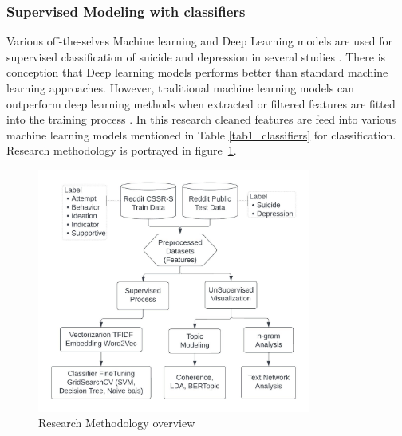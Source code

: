\documentclass[sn-mathphys,Numbered]{sn-jnl}%
\theoremstyle{thmstyleone}%
\theoremstyle{thmstyletwo}%
\theoremstyle{thmstylethree}%
\begin{document}
\subsubsection{Supervised Modeling with classifiers}
Various off-the-selves Machine learning and Deep Learning models are used for supervised classification of suicide and depression in several studies \cite{castillo2020suicide, zhang2022natural}. There is conception that Deep learning models performs better than standard machine learning approaches. However, traditional machine learning models can outperform deep learning methods when extracted or filtered features are fitted into the training process \cite{castillo2020suicide, chancellor2020methods}. In this research cleaned features are feed into various machine learning models mentioned in Table \ref{tab1_classifiers} for classification. 
%
%
Research methodology is portrayed in figure~\ref{fig:res_diagram}.
\begin{figure}[h!]
\centering
\includegraphics[width=0.8\textwidth]{res_diagram.jpeg}
\caption{Research Methodology overview}
\label{fig:res_diagram}
\end{figure}
\end{document}
